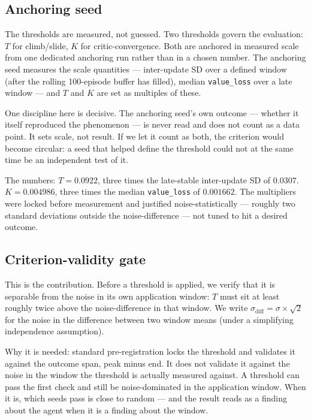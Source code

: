 \documentclass{article}
\newcommand{\code}[1]{\texttt{#1}}
\begin{document}
\subsection{Anchoring seed}
\label{sec:2.3}

The thresholds are measured, not guessed. Two thresholds govern the evaluation: $T$ for climb/slide, $K$ for critic-convergence. Both are anchored in measured scale from one dedicated anchoring run rather than in a chosen number. The anchoring seed measures the scale quantities --- inter-update SD over a defined window (after the rolling 100-episode buffer has filled), median \code{value\_loss} over a late window --- and $T$ and $K$ are set as multiples of these.

One discipline here is decisive. The anchoring seed's own outcome --- whether it itself reproduced the phenomenon --- is never read and does not count as a data point. It sets scale, not result. If we let it count as both, the criterion would become circular: a seed that helped define the threshold could not at the same time be an independent test of it.

The numbers: $T = 0.0922$, three times the late-stable inter-update SD of $0.0307$. $K = 0.004986$, three times the median \code{value\_loss} of $0.001662$. The multipliers were locked before measurement and justified noise-statistically --- roughly two standard deviations outside the noise-difference --- not tuned to hit a desired outcome.

\subsection{Criterion-validity gate}
\label{sec:2.4}

This is the contribution. Before a threshold is applied, we verify that it is separable from the noise in its own application window: $T$ must sit at least roughly twice above the noise-difference in that window. We write $\sigma_\mathrm{diff} = \sigma \times \sqrt{2}$ for the noise in the difference between two window means (under a simplifying independence assumption).

Why it is needed: standard pre-registration locks the threshold and validates it against the outcome span, peak minus end. It does not validate it against the noise in the window the threshold is actually measured against. A threshold can pass the first check and still be noise-dominated in the application window. When it is, which seeds pass is close to random --- and the result reads as a finding about the agent when it is a finding about the window.
\end{document}
